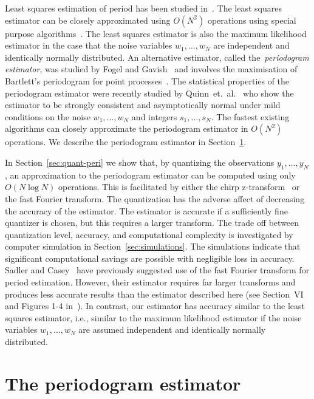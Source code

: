 \documentclass[10pt,twocolumn,twoside]{IEEEtran}
\begin{document}
Least squares estimation of period has been studied in~\cite{Clarkson2007,McKilliam2007,Quinn_sparse_noisy_SSP_2012}.  The least squares estimator can be closely approximated using $O(N^2)$ operations using special purpose algorithms~\cite{McKilliam2009CoxeterLattices,McKilliam2008}.  The least squares estimator is also the maximum likelihood estimator in the case that the noise variables $w_1,\dots,w_N$ are independent and identically normally distributed.  An alternative estimator, called the~\emph{periodogram estimator}, was studied by Fogel and Gavish~\cite{Fogel1988,Fogel1989_bit_synch_zero_crossings} and involves the maximisation of Bartlett's periodogram for point processes~\cite{Bartlest_periodgram_point_process_1963}.  The statistical properties of the periodogram estimator were recently studied by Quinn~et.~al.~\cite{Quinn20013asilomar_period_est} who show the estimator to be strongly consistent and asymptotically normal under mild conditions on the noise $w_1,\dots,w_N$ and integers $s_1,\dots,s_N$.  The fastest existing algorithms can closely approximate the periodogram estimator in $O(N^2)$ operations.  We describe the periodogram estimator in Section~\ref{sec:peri-estim}.

In Section~\ref{sec:quant-peri} we show that, by quantizing the observations $y_1,\dots,y_N$, an approximation to the periodogram estimator can be computed using only $O(N\log N)$ operations.  This is facilitated by either the chirp z-transform~\cite{Rabiner1969} or the fast Fourier transform.  The quantization has the adverse affect of decreasing the accuracy of the estimator.  The estimator is accurate if a sufficiently fine quantizer is chosen, but this requires a larger transform.  The trade off between quantization level, accuracy, and computational complexity is investigated by computer simulation in Section~\ref{sec:simulations}.  The simulations indicate that significant computational savings are possible with negligible loss in accuracy.  Sadler and Casey~\cite{726812} have previously suggested use of the fast Fourier transform for period estimation.  However, their estimator requires far larger transforms and produces less accurate results than the estimator described here (see Section~VI and Figures 1-4 in~\cite{726812}).  In contrast, our estimator has accuracy similar to the least squares estimator, i.e., similar to the maximum likelihood estimator if the noise variables $w_1,\dots,w_N$ are assumed independent and identically normally distributed.
 
\section{The periodogram estimator}\label{sec:peri-estim}
\end{document}
